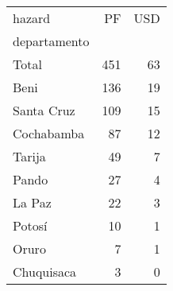 \begin{tabular}{lrr}
\toprule
hazard &   PF &  USD \\
departamento &      &      \\
\midrule
Total        &  451 &   63 \\
Beni         &  136 &   19 \\
Santa Cruz   &  109 &   15 \\
Cochabamba   &   87 &   12 \\
Tarija       &   49 &    7 \\
Pando        &   27 &    4 \\
La Paz       &   22 &    3 \\
Potosí       &   10 &    1 \\
Oruro        &    7 &    1 \\
Chuquisaca   &    3 &    0 \\
\bottomrule
\end{tabular}

